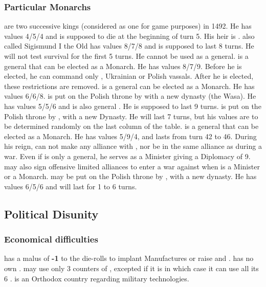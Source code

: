 \subsubsection{Particular Monarchs}
 are two successive kings
(considered as one for game purposes) in 1492.  He has values 4/5/4 and
is supposed to die at the beginning of turn 5. His heir is
.
 also called Sigismund I the Old has
values 8/7/8 and is supposed to last 8 turns. He will not test survival
for the first 5 turns. He cannot be used as a general.
 is a general 
that can be elected as a Monarch. He has values 8/7/9.
\bparag Before he is elected, he can command only \LD, Ukrainian \ARMY
or Polish vassals.
\bparag After he is elected, these restrictions are removed.
 is a general
 can be elected as a Monarch. He has values
6/6/8.
 is put on the Polish throne by
 with a new dynasty (the Wasa). He
has values 5/5/6 and is also general . He is
supposed to last 9 turns.
 is put on the Polish throne by
, with a new Dynasty. He will last 7
turns, but his values are to be determined randomly on the last column
of the table.
 is a general 
that can be elected as a Monarch. He has values 5/9/4, and lasts from
turn 42 to 46. During his reign, \POL can not make any alliance with
\SUE, nor be in the same alliance as \SUE during a war.
\bparag Even if  is only a general, he serves as a
Minister giving a Diplomacy of 9. \POL may also sign offensive limited
alliances to enter a war against \SUE when  is a Minister
or a Monarch.
 may be put on the Polish throne by
, with a new dynasty. He has
values 6/5/6 and will last for 1 to 6 turns.

\subsection{Political Disunity}
\subsubsection{Economical difficulties}
\aparag \POL has a malus of {\bf -1} to the die-rolls to implant
Manufactures or raise \FTI and \DTI.
\aparag \POL has no own \CTZ.
\aparag \POL may use only 3 counters of \TradeFLEET, excepted if it is
 in which case it can use all its 6 \TradeFLEET.
\aparag \POL is an Orthodox country regarding military technologies.
